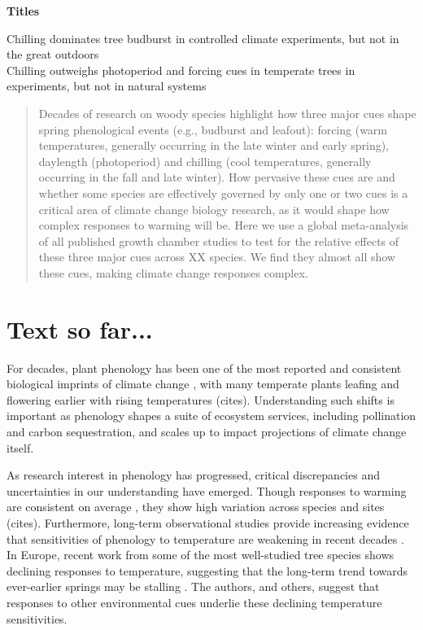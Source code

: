 \documentclass[11pt,letter]{article}
\begin{document}
%


\renewcommand{\refname}{\CHead{}}


{\bf Titles}

Chilling dominates tree budburst in controlled climate experiments, but not in the great outdoors\\
Chilling outweighs photoperiod and forcing cues in temperate trees in experiments, but not in natural systems


\begin{abstract}
Decades of research on woody species highlight how three major cues shape spring phenological events (e.g., budburst and leafout): forcing (warm temperatures, generally occurring in the late winter and early spring), daylength (photoperiod) and chilling (cool temperatures, generally occurring in the fall and late winter). How pervasive these cues are and whether some species are effectively governed by only one or two cues is a critical area of climate change biology research, as it would shape how complex responses to warming will be. Here we use a global meta-analysis of all published growth chamber studies to test for the relative effects of these three major cues across XX species. We find they almost all show these cues, making climate change responses complex. 
\end{abstract}

\section* {Text so far...}

\par For decades, plant phenology has been one of the most reported and consistent biological imprints of climate change \citep{IPCC:2014sm}, with many temperate plants leafing and flowering earlier with rising temperatures (cites). Understanding such shifts is important as phenology shapes a suite of ecosystem services, including pollination and carbon sequestration, and scales up to impact projections of climate change itself. 

\par As research interest in phenology has progressed, critical discrepancies and uncertainties in our understanding have emerged. Though responses to warming are consistent on average \citep{Wolkovich:2012n}, they show high variation across species and sites (cites). Furthermore, long-term observational studies provide increasing evidence that sensitivities of phenology to temperature are weakening in recent decades \citep{yu2010}. In Europe, recent work from some of the most well-studied tree species shows declining responses to temperature, suggesting that the long-term trend towards ever-earlier springs may be stalling \citep{fu2015}. The authors, and others, suggest that responses to other environmental cues underlie these declining temperature sensitivities.
\end{document}
